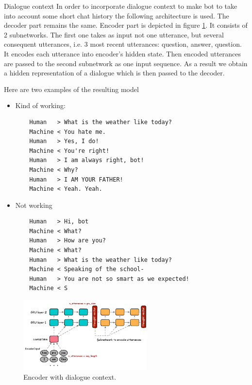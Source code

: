 \documentclass[12pt,a4paper]{article}
\begin{document}
\begin{section}{Dialogue context}
In order to incorporate dialogue context to make bot to take into account some short chat history
the following architecture is used.
The decoder part remains the same.
Encoder part is depicted in figure \ref{fig:dialogue_context}.
It consists of 2 subnetworks.
The first one takes as input not one utterance, but several consequent utterances, i.e. 3 most recent
utterances: question, answer, question. It encodes each utterance into encoder's hidden state.
Then encoded utterances are passed to the second subnetwork as one input sequence.
As a result we obtain a hidden representation of a dialogue which is then passed to the decoder.

Here are two examples of the resulting model
\begin{multicols}{2}
\begin{itemize}
    \item Kind of working:
    \footnotesize{
    \begin{verbatim}
    Human   > What is the weather like today?
    Machine < You hate me.
    Human   > Yes, I do!
    Machine < You're right!
    Human   > I am always right, bot!
    Machine < Why?
    Human   > I AM YOUR FATHER!
    Machine < Yeah. Yeah.
    \end{verbatim}
    }
    \item \normalsize Not working
    \footnotesize{
    \begin{verbatim}
    Human   > Hi, bot
    Machine < What?
    Human   > How are you?
    Machine < What?
    Human   > What is the weather like today?
    Machine < Speaking of the school-
    Human   > You are not so smart as we expected!
    Machine < S
    \end{verbatim}
    }
\end{itemize}
\end{multicols}

\begin{figure}
    \centering
    \includegraphics[width=0.6\textwidth]{figures/dialogue_context.png}
    \caption{Encoder with dialogue context.}
    \label{fig:dialogue_context}
\end{figure}
\end{section}
\end{document}
